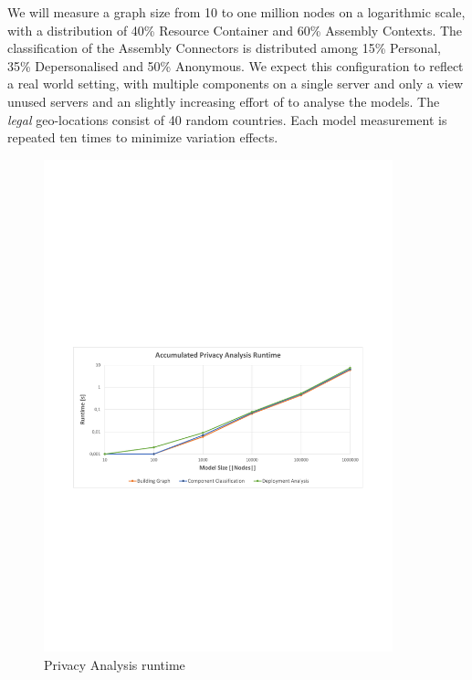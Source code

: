 We will measure a graph size from 10 to one million nodes on a logarithmic scale, with a distribution of 40\% Resource Container and 60\% Assembly Contexts. The classification of the Assembly Connectors is distributed among 15\% Personal, 35\% Depersonalised and 50\% Anonymous. We expect this configuration to reflect a real world setting, with multiple components on a single server and only a view unused servers and an slightly increasing effort of to analyse the models. The \textit{legal} geo-locations consist of 40 random countries. Each model measurement is repeated ten times to minimize variation effects.

\begin{figure}[h]
	\centering
	\includegraphics[trim = 15mm 95mm 13mm 110mm, clip, width=0.90\textwidth]{graphs/Runtime_pa}
	\caption{Privacy Analysis runtime}
	\label{fig:eval:pa:runtime}
\end{figure}


